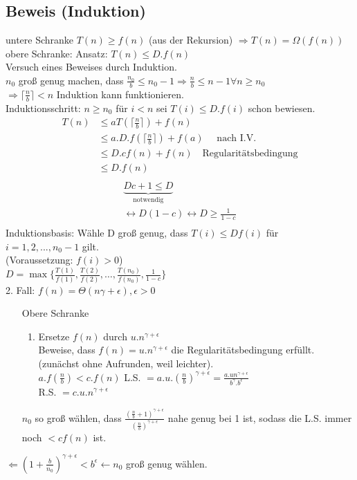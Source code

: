 \subsection*{Beweis (Induktion)}
untere Schranke $T(n) \geq f(n)$ (aus der Rekursion) $\Rightarrow T(n) = \Omega(f(n))$\\
obere Schranke: Ansatz: $T(n) \leq D.f(n)$\\
Versuch eines Beweises durch Induktion.\\
$n_0$ groß genug machen, dass $\frac{n_0}{b} \leq n_0 -1\Rightarrow \frac{n}{b} \leq n-1 \forall n \geq n_0$\\
$\Rightarrow \lceil \frac{n}{b} \rceil < n$ Induktion kann funktionieren.\\
Induktionsschritt: $n \geq n_0$ für $i < n$ sei $T(i) \leq D.f(i)$ schon bewiesen.\\
\begin{align*}
T(n) & \leq a T(\lceil \frac{n}{b} \rceil) + f(n)\\
& \leq a.D.f(\lceil \frac{n}{b} \rceil) + f(a) \quad \text{ nach I.V.}\\
& \leq D.cf(n) + f(n) \quad \text{Regularitätsbedingung}\\
& \leq D.f(n)\\
\end{align*}
\begin{align*}
\underbrace{Dc+1 \leq D}_{\text{notwendig}}\\
\leftrightarrow D(1-c) \leftrightarrow D \geq \frac{1}{1-c}\\
\end{align*}
Induktionsbasis: Wähle D groß genug, dass $T(i) \leq Df(i)$ für $i=1,2,...,n_0-1$ gilt.\\
(Voraussetzung: $f(i) > 0$)\\
$D = \max\{\frac{T(1)}{f(1)},\frac{T(2)}{f(2)},\dots,\frac{T(n_0)}{f(n_0)},\frac{1}{1-c}\}$\\
2. Fall: $f(n)=\Theta(n{\gamma + \epsilon}), \epsilon > 0$
\begin{enumerate}
\item[Obere Schranke]
\begin{enumerate}
\item Ersetze $f(n)$ durch $u.n^{\gamma + \epsilon}$\\
Beweise, dass $f(n) = u.n^{\gamma + \epsilon}$ die Regularitätsbedingung erfüllt. (zunächst ohne Aufrunden, weil leichter).\\%
$a.f(\frac{n}{b}) < c.f(n)$
L.S. $= a.u.(\frac{n}{b})^{\gamma + \epsilon} = \frac{a.u n^{\gamma + \epsilon}}{b^\gamma . b^\epsilon}$\\
R.S. $= c.u.n^{\gamma + \epsilon}$
\end{enumerate}
$n_0$ so groß wählen, dass $\frac{(\frac{n}{b}+1)^{\gamma + \epsilon}}{(\frac{n}{b})^{\gamma + \epsilon}}$ nahe genug bei 1 ist, sodass die L.S. immer noch $< cf(n)$ ist.\\
\end{enumerate}
$\Leftarrow (1+\frac{b}{n_0})^{\gamma	+ \epsilon} < b^\epsilon \leftarrow n_0$ groß genug wählen.  
